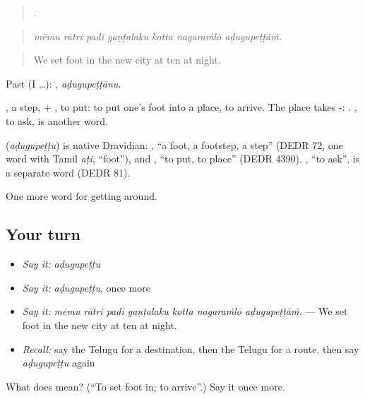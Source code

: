 \begin{quote}
      .
\end{quote}

\begin{quote}
\emph{mēmu rātri padi gaṇṭalaku kotta nagaraṁlō aḍugupeṭṭāṁ.}
\end{quote}

\begin{quote}
We set foot in the new city at ten at night.
\end{quote}

Past (I …): , \emph{aḍugupeṭṭānu}.

, a step, + , to put: to put one's foot into a place, to arrive. The place takes -:  . , to ask, is another word.

\begin{cousinweb}
\textbf{} (\emph{aḍugupeṭṭu}) is native Dravidian: , \textquotedblleft{}a foot, a footstep, a step\textquotedblright{} (DEDR 72, one word with Tamil \emph{aṭi}, \textquotedblleft{}foot\textquotedblright{}), and , \textquotedblleft{}to put, to place\textquotedblright{} (DEDR 4390). , \textquotedblleft{}to ask\textquotedblright{}, is a separate word (DEDR 81).
\end{cousinweb}

\begin{grammarlens}[title={What you've built}]
One more word for getting around.
\end{grammarlens}

\subsection*{Your turn}
\begin{itemize}
\raggedright
  \item \emph{Say it:} \emph{aḍugupeṭṭu}
  \item \emph{Say it:} \emph{aḍugupeṭṭu}, once more
  \item \emph{Say it:} \emph{mēmu rātri padi gaṇṭalaku kotta nagaraṁlō aḍugupeṭṭāṁ.} — We set foot in the new city at ten at night.
  \item \emph{Recall:} say the Telugu for a destination, then the Telugu for a route, then say \emph{aḍugupeṭṭu} again
\end{itemize}

\begin{tcolorbox}[breakable,colback=teal!4,colframe=teal!35!black,title={Before you move on}]
What does  mean? (\textquotedblleft{}To set foot in; to arrive\textquotedblright{}.) Say it once more.
\end{tcolorbox}
